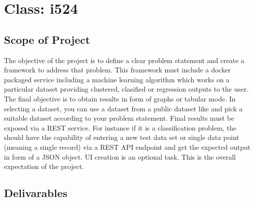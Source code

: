 \section{Class: i524}\label{s:i524-project}

\subsection{Scope of Project}

The objective of the project is to define a clear problem statement
and create a framework to address that problem. This framework must
include a docker packaged service including a machine learning
algorithm which works on a particular dataset providing clustered,
clasified or regression outputs to the user. The final objective is to
obtain results in form of graphs or tabular mode. In selecting a
dataset, you can use a dataset from a public dataset like
 and pick a suitable
dataset according to your problem statement. Final results must be
exposed via a REST service. For instance if it is a classification
problem, the should have the capability of entering a new test data
set or single data point (meaning a single record) via a REST API endpoint
and get the expected output in form of a JSON object. UI creation is an
optional task. This is the overall expectation of the project. 

\subsection{Delivarables}


